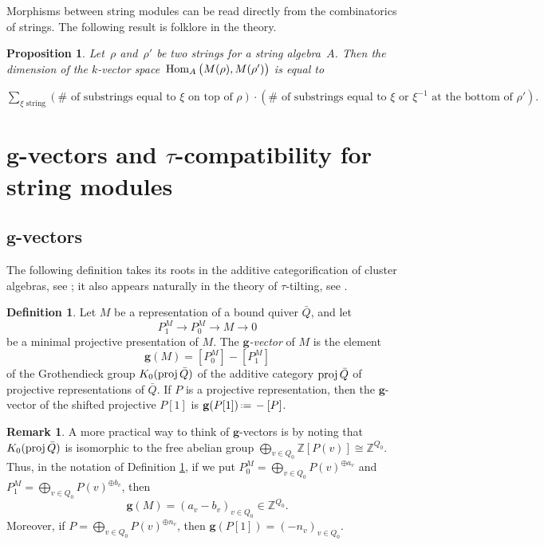 \documentclass{amsart}
\newtheorem{proposition}[theorem]{Proposition}
\theoremstyle{definition}
\newtheorem{definition}[theorem]{Definition}
\newtheorem{remark}[theorem]{Remark}
\newcommand{\Z}{\mathbb{Z}} %
\renewcommand{\b}[1]{\mathbf{#1}} %
\newcommand{\eqdef}{\mbox{\,\raisebox{0.2ex}{\scriptsize\ensuremath{\mathrm:}}\ensuremath{=}\,}} %
\newcommand{\darkblue}{\color{darkblue}} %
\newcommand{\defn}[1]{\textsl{\darkblue #1}} %
\newcommand{\Hom}[1]{\operatorname{{\rm Hom}}_{#1}}
\newcommand{\proj}{\operatorname{{\rm proj}}}
\begin{document}
Morphisms between string modules can be read directly from the combinatorics of strings.  The following result is folklore in the theory.

\begin{proposition}
\label{prop:morphismsStringModules}
Let~$\rho$ and~$\rho'$ be two strings for a string algebra~$A$.
Then the dimension of the $k$-vector space~$\Hom{A} \big( M(\rho), M(\rho') \big)$ is equal to

\smallskip
\centerline{
\(
\sum\limits_{\xi \text{ string}}  (\#\textrm{ of substrings equal to~$\xi$ on top of~$\rho$}) \cdot  (\#\textrm{ of substrings equal to~$\xi$ or~$\xi^{-1}$ at the bottom of~$\rho'$}).
\)
}
\end{proposition}


\section{$\b{g}$-vectors and $\tau$-compatibility for string modules}
\label{sec:stringModules}

\subsection{$\b{g}$-vectors}
\label{subsec:gvectors}

The following definition takes its roots in the additive categorification of cluster algebras, see \cite{DehyKeller};
it also appears naturally in the theory of $\tau$-tilting, see \cite[Sect.~5.1]{AdachiIyamaReiten}.

\begin{definition}
\label{definition: g-vector of representation}
 Let $M$ be a representation of a bound quiver $\bar Q$, and let
 \[
  P^M_1 \to P^M_0 \to M \to 0
 \]
 be a minimal projective presentation of $M$.  
 The \defn{$\b{g}$-vector} of $M$ is the element 
 \[
  \b{g}(M) = [P_0^M­] - [P_1^M]
 \]
 of the Grothendieck group $K_0(\proj \bar Q)$ of the additive category $\proj \bar Q$ of projective representations of $\bar Q$. 
 If $P$ is a projective representation, then the $\b{g}$-vector of the shifted projective $P[1]$ is $\b{g}(P[1]) \eqdef -[P]$.
\end{definition}

\begin{remark}
 A more practical way to think of $\b{g}$-vectors is by noting that $K_0(\proj \bar Q)$ is isomorphic to the free abelian group
 $\bigoplus_{v\in Q_0} \Z [P(v)] \cong \Z^{Q_0}$.  Thus, in the notation of Definition \ref{definition: g-vector of representation},
 if we put $P_0^M = \bigoplus_{v\in Q_0}P(v)^{\oplus a_v}$ and $P_1^M = \bigoplus_{v\in Q_0}P(v)^{\oplus b_v}$, 
 then
 \[
  \b{g}(M) = (a_v - b_v)_{v\in Q_0} \in \Z^{Q_0}.
 \] 
 Moreover, if $P = \bigoplus_{v\in Q_0}P(v)^{\oplus n_v}$, then $\b{g}(P[1]) = (-n_v)_{v\in Q_0}$.
\end{remark}
\end{document}
